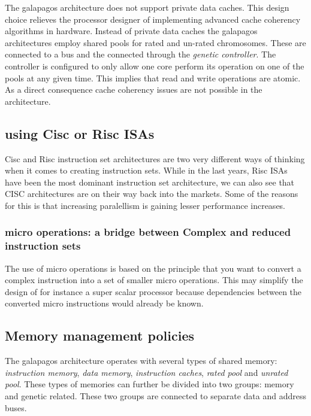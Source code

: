 The galapagos architecture does not support private data caches. This design choice relieves the processor designer of implementing advanced cache coherency algorithms in hardware. Instead of private data caches the galapagos architectures employ shared pools for rated and un-rated chromosomes. These are connected to a bus and the connected through the \emph{genetic controller}. The controller is configured to only allow one core perform its operation on one of the pools at any given time. This implies that read and write operations are atomic. As a direct consequence cache coherency issues are not possible in the architecture. 




\subsection{using Cisc or Risc ISAs}
Cisc and Risc instruction set architectures are two very different ways of thinking when it comes to creating instruction sets.
While in the last years, Risc ISAs have been the most dominant instruction set architecture, we can also see that CISC architectures
are on their way back into the markets. Some of the reasons for this is that increasing paralellism is gaining lesser performance increases.

\subsubsection{micro operations: a bridge between Complex and reduced instruction sets}
The use of micro operations is based on the principle that you want to convert a complex instruction into a set of smaller micro operations. This
may simplify the design of for instance a super scalar processor because dependencies between the converted micro instructions would already be known. 

\subsection{Memory management policies}
The galapagos architecture operates with several types of shared memory: \emph{instruction memory}, \emph{data memory}, \emph{instruction caches}, \emph{rated pool} and \emph{unrated pool}. These types of memories  can further be divided into two groups: memory and genetic related. These two groups are connected to separate data and address buses.  


\section{}
